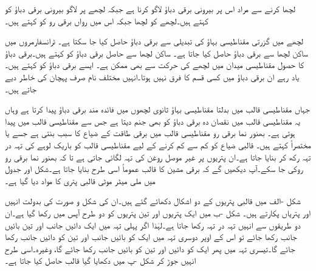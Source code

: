 لچھا  کرنے سے مراد اس پر بیرونی برقی دباؤ لاگو کرنا ہے  جبکہ لچھے پر لاگو بیرونی برقی دباؤ کو   کہتے ہیں۔لچھے  کو  لچھا جبکہ اس میں رواں برقی رو کو  کہتے ہیں۔

لچھے میں گزرتی مقناطیسی بہاؤ کی تبدیلی سے  برقی دباؤ حاصل کیا جا سکتا ہے۔ ٹرانسفارمروں میں ساکن لچھا سے برقی دباؤ حاصل کیا جاتا ہے۔ ساکن لچھا سے حاصل برقی دباؤ کو   کہتے ہیں۔برقی دباؤ کا حصول مقناطیسی میدان میں لچھے کی حرکت سے بھی ممکن ہے۔ ایسے برقی دباؤ کو   کہتے ہیں۔یاد رہے ان برقی دباؤ میں کسی قسم کا فرق نہیں ہوتا۔انہیں مختلف نام صرف پہچان کی خاطر دیے جاتے ہیں۔

جہاں مقناطیسی قالب میں بدلتا مقناطیسی بہاؤ ثانوی لچھوں میں فائدہ مند برقی دباؤ پیدا کرتا ہے وہاں یہ مقناطیسی قالب میں نقصان دہ برقی دباؤ کو بھی جنم دیتا ہے جس سے مقناطیسی قالب میں  پیدا ہوتی  ہے۔ بھنور نما برقی رو مقناطیسی قالب میں برقی طاقت کے ضیاع کا سبب بنتی ہے جسے   یا  مختصراً  کہتے ہیں۔ قالبی ضیاع کو کم سے کم کرنے کے لیے مقناطیسی قالب کو  باریک لوہے کی  تہہ در تہہ رکھ کر بنایا جاتا ہے۔ان پتریوں پر غیر موصل روغن کی تہہ لگائی جاتی ہے تا کہ بھنور نما برقی رو  روکی جا سکے۔آپ دیکھیں گے کہ برقی مشین کا قالب عموماً اسی طرح بنایا جاتا ہے۔شکل  اور جدول   میں  ملی میٹر موٹی  قالبی پتری کا  مواد دیا گیا ہے۔

شکل -الف میں قالبی پتریوں کے دو اشکال دکھائے گئے ہیں۔ان کی شکل و صورت کی بدولت انہیں  اور   پتریاں پکارتے ہیں۔ شکل -ب میں ایک پتریوں اور تین پتریوں   کو دو طرح آپس میں رکھا گیا ہے۔ان دو طریقوں سے انہیں تہہ در تہہ رکھا جاتا ہے۔لہٰذا اگر پہلی تہہ میں ایک دائیں جانب اور تین بائیں جانب رکھا جائے تو اس کے اوپر دوسری تہہ میں ایک کو بائیں جانب اور تین کو دائیں جانب رکھا جائے گا۔تیسری تہہ میں پھر ایک کو دائیں اور تین کو بائیں جانب رکھا جائے گا، وغیرہ۔اسی طرح انہیں جوڑ کر شکل -پ میں دکھایا گیا قالب حاصل کیا جاتا ہے۔

